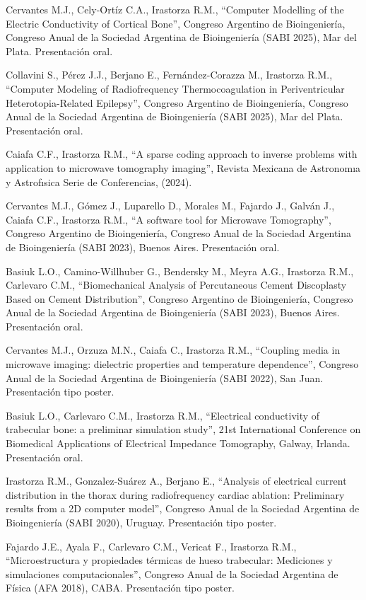 \documentclass[margin,line]{res}
\begin{document}
\begin{resume}
Cervantes M.J., Cely-Ortíz C.A., Irastorza R.M., ``Computer Modelling of the Electric Conductivity of Cortical Bone'', Congreso Argentino de Bioingeniería,  Congreso Anual de la Sociedad Argentina de Bioingeniería (SABI 2025), Mar del Plata. Presentación oral.

Collavini S., Pérez J.J., Berjano E., Fernández-Corazza M., Irastorza R.M., ``Computer Modeling of Radiofrequency Thermocoagulation in Periventricular Heterotopia-Related Epilepsy'', Congreso Argentino de Bioingeniería,  Congreso Anual de la Sociedad Argentina de Bioingeniería (SABI 2025), Mar del Plata. Presentación oral.

Caiafa C.F., Irastorza R.M., ``A sparse coding approach to inverse problems with application to microwave tomography imaging'', Revista Mexicana de Astronomıa y Astrofısica Serie de Conferencias, (2024).

Cervantes M.J., Gómez J., Luparello D., Morales M., Fajardo J., Galván J., Caiafa C.F., Irastorza R.M., ``A software tool for Microwave Tomography'', Congreso Argentino de Bioingeniería,  Congreso Anual de la Sociedad Argentina de Bioingeniería (SABI 2023), Buenos Aires. Presentación oral.

Basiuk L.O., Camino-Willhuber G., Bendersky M., Meyra A.G., Irastorza R.M., Carlevaro C.M., ``Biomechanical Analysis of Percutaneous Cement Discoplasty Based on Cement Distribution'', Congreso Argentino de Bioingeniería,  Congreso Anual de la Sociedad Argentina de Bioingeniería (SABI 2023), Buenos Aires. Presentación oral.

Cervantes M.J., Orzuza M.N., Caiafa C., Irastorza R.M., ``Coupling media in microwave imaging: dielectric properties and temperature dependence'', Congreso Anual de la Sociedad Argentina de Bioingeniería (SABI 2022), San Juan. Presentación tipo poster.

Basiuk L.O., Carlevaro C.M., Irastorza R.M., ``Electrical conductivity of trabecular bone: a preliminar simulation study'', 21st International Conference on Biomedical Applications of Electrical Impedance Tomography, Galway, Irlanda. Presentación oral.

Irastorza R.M., Gonzalez-Suárez A., Berjano E., ``Analysis of electrical current distribution in the thorax during radiofrequency cardiac ablation: Preliminary results from a 2D computer model'', Congreso Anual de la Sociedad Argentina de Bioingeniería (SABI 2020), Uruguay. Presentación tipo poster.

Fajardo J.E., Ayala F., Carlevaro C.M., Vericat F., Irastorza R.M., ``Microestructura y propiedades térmicas de hueso trabecular: Mediciones y simulaciones computacionales'', Congreso Anual de la Sociedad Argentina de Física (AFA 2018), CABA. Presentación tipo poster.


\end{resume}
\end{document}
